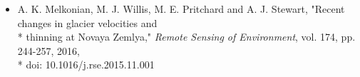 
\begin{itemize}
    \item A. K. Melkonian, M. J. Willis, M. E. Pritchard and A. J. Stewart, "Recent changes in glacier velocities and \\* thinning at Novaya Zemlya," \textit{Remote Sensing of Environment}, vol. 174, pp. 244-257, 2016, \\* doi: 10.1016/j.rse.2015.11.001
\end{itemize}
